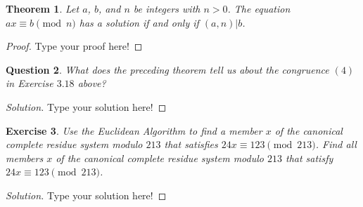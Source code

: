\documentclass[12pt,leqno]{article}
\numberwithin{equation}{section}
\newtheorem{thm}{Theorem}[section]
\newtheorem{exer}[thm]{Exercise}
\newtheorem{ques}[thm]{Question}
\theoremstyle{definition}
\begin{document}
\begin{thm}
Let $a$, $b$, and $n$ be integers with $n > 0$. The equation $ax
\equiv b \pmod{n}$ has a solution if and only if $(a, n)|b$.
\end{thm}

\begin{proof}[Proof]
Type your proof here!
\end{proof}



\begin{ques}
What does the preceding theorem tell us about the congruence $(4)$
in Exercise $3.18$ above?
\end{ques}

\begin{proof}[Solution]
Type your solution here!
\end{proof}


\begin{exer}
Use the Euclidean Algorithm to find a
member $x$ of the canonical complete residue system modulo $213$
that satisfies $24x \equiv 123 \pmod{213}$. Find all members $x$ of
the canonical complete residue system modulo $213$ that satisfy $24x
\equiv 123 \pmod{213}$.
\end{exer}

\begin{proof}[Solution]
Type your solution here!
\end{proof}
\end{document}
